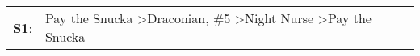 \begin{supertabular}{p{0.03\textwidth}p{0.92\textwidth}}
 \textbf{S1}:  &  Pay the Snucka\textsuperscript{} \textgreater \enspace Draconian\textsuperscript{}, \enspace \#5\textsuperscript{} \textgreater \enspace Night Nurse\textsuperscript{} \textgreater \enspace Pay the Snucka\textsuperscript{}  \enspace  \\
\end{supertabular}
